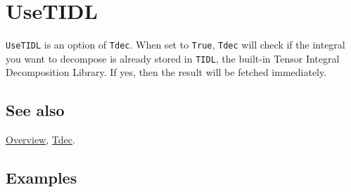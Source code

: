 \documentclass[../FeynCalcManual.tex]{subfiles}
\begin{document}
\hypertarget{usetidl}{
\section{UseTIDL}\label{usetidl}}

\texttt{UseTIDL} is an option of \texttt{Tdec}. When set to
\texttt{True}, \texttt{Tdec} will check if the integral you want to
decompose is already stored in \texttt{TIDL}, the built-in Tensor
Integral Decomposition Library. If yes, then the result will be fetched
immediately.

\subsection{See also}

\hyperlink{toc}{Overview}, \hyperlink{tdec}{Tdec}.

\subsection{Examples}
\end{document}

